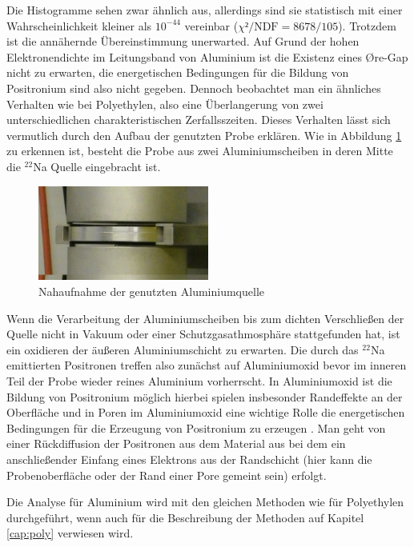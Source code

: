 \documentclass[a4paper,12pt]{article}
\begin{document}
Die Histogramme sehen zwar ähnlich aus, allerdings sind sie statistisch mit einer Wahrscheinlichkeit
kleiner als $10^{-44}$ vereinbar ($χ²/\text{NDF} = 8678/105$).
Trotzdem ist die annähernde Übereinstimmung unerwarted. Auf Grund der hohen Elektronendichte im Leitungsband von Aluminium ist die Existenz eines Øre-Gap nicht zu erwarten, die 
energetischen Bedingungen für die Bildung von Positronium sind also nicht gegeben. Dennoch beobachtet man ein ähnliches Verhalten wie bei 
Polyethylen, also eine Überlangerung von zwei unterschiedlichen charakteristischen Zerfallsszeiten. Dieses Verhalten lässt sich vermutlich durch
den Aufbau der genutzten Probe erklären.
Wie in Abbildung \ref{fig:quelle_nah} zu erkennen ist,
besteht die Probe aus zwei Aluminiumscheiben in deren Mitte die $^{22}$Na Quelle eingebracht ist.
\begin{figure}
	\centering
	\includegraphics[width=0.5\textwidth]{../pictures/quelle_nah.jpg}
	\caption{Nahaufnahme der genutzten Aluminiumquelle }
	\label{fig:quelle_nah}
\end{figure}


Wenn die Verarbeitung der Aluminiumscheiben bis zum dichten Verschließen der Quelle nicht
in Vakuum oder einer Schutzgasathmosphäre stattgefunden hat, ist ein oxidieren der äußeren Aluminiumschicht zu erwarten. Die durch das $^{22}$Na
emittierten Positronen treffen also zunächst auf Aluminiumoxid bevor im inneren Teil der Probe wieder reines Aluminium vorherrscht. In Aluminiumoxid
ist die Bildung von Positronium möglich \cite{PhysRevB.70.115410} hierbei spielen insbesonder Randeffekte an der Oberfläche und in Poren im
Aluminiumoxid eine wichtige Rolle die energetischen Bedingungen für die Erzeugung von Positronium zu erzeugen \cite{phd_trezzi}. Man geht von
einer Rückdiffusion der Positronen aus dem Material aus bei dem ein anschließender Einfang eines Elektrons aus der Randschicht 
(hier kann die Probenoberfläche oder der Rand einer Pore gemeint sein) erfolgt.

Die Analyse für Aluminium wird mit den gleichen Methoden wie für Polyethylen durchgeführt, wenn auch für die
Beschreibung der Methoden auf Kapitel \ref{cap:poly} verwiesen wird.
\end{document}
